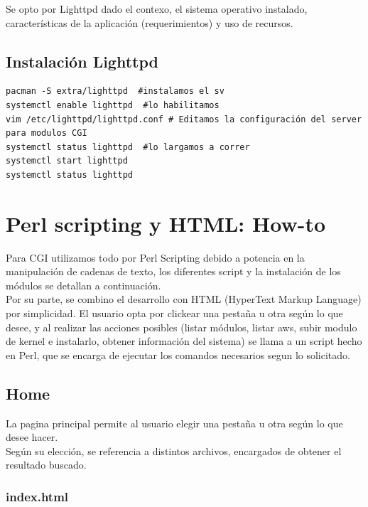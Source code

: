 \documentclass{article}
\begin{document}
Se opto por Lighttpd dado el contexo, el sistema operativo instalado, características de la aplicación (requerimientos) y uso de recursos. \\




\subsection{Instalación Lighttpd}
\begin{lstlisting}[style=PerlStyle]
pacman -S extra/lighttpd  #instalamos el sv
systemctl enable lighttpd  #lo habilitamos
vim /etc/lighttpd/lighttpd.conf # Editamos la configuración del server para modulos CGI
systemctl status lighttpd  #lo largamos a correr
systemctl start lighttpd
systemctl status lighttpd
\end{lstlisting}


\section{Perl scripting y HTML: How-to}

Para CGI utilizamos todo por Perl Scripting debido a potencia en la manipulación de cadenas de texto, los diferentes script y la instalación de los módulos se detallan a
continuación.\\

Por su parte, se combino el desarrollo con HTML (HyperText Markup Language) por simplicidad. El usuario opta por clickear una pestaña u otra según lo que desee, y al realizar
las acciones posibles (listar módulos, listar aws, subir modulo de kernel e instalarlo, obtener información del sistema) se llama a un script hecho en Perl, que se encarga de ejecutar los 
comandos necesarios segun lo solicitado.\\
\subsection{Home}
La pagina principal permite al usuario elegir una pestaña u otra según lo que desee hacer.\\ 
Según su elección, se referencia a distintos archivos, encargados de obtener el resultado buscado.
\subsubsection{index.html}

   
\end{document}
